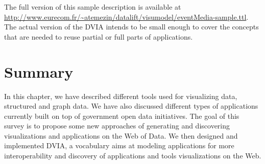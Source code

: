 The full version of this sample description is available at \url{http://www.eurecom.fr/~atemezin/datalift/visumodel/eventMedia-sample.ttl}. The actual version of the DVIA intends to be small enough to cover the concepts that are needed to reuse partial or full parts of applications. 



  
  \section{Summary}
  In this chapter, we have described different tools used for visualizing data, structured and graph data. We have also discussed different types of applications currently built on top of government open data initiatives. The goal of this survey is to propose some new approaches of generating and discovering visualizations and applications on the Web of Data. We then designed and implemented DVIA, a vocabulary aims at modeling applications for more interoperability and discovery of applications and tools visualizations on the Web.   

